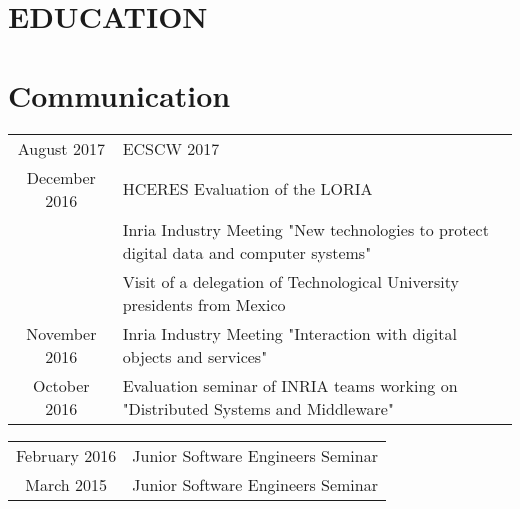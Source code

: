 \section{EDUCATION}

\descript{}
\sectionsep


\section{Communication}

\descript{}
\vspace{5pt}
\begin{tabular}{cp{150mm}}
August 2017         & ECSCW 2017\\
December 2016       & HCERES Evaluation of the LORIA\\
                    & Inria Industry Meeting "New technologies to protect digital data and computer systems"\\
                    & Visit of a delegation of Technological University presidents from Mexico\\
November 2016       & Inria Industry Meeting "Interaction with digital objects and services"\\
October 2016        & Evaluation seminar of INRIA teams working on "Distributed Systems and Middleware"\\
\end{tabular}
\sectionsep
\sectionsep

\descript{}
\vspace{5pt}
\begin{tabular}{cl}
February 2016        & Junior Software Engineers Seminar\\
March 2015           & Junior Software Engineers Seminar\\
\end{tabular}
\sectionsep

\hfill

